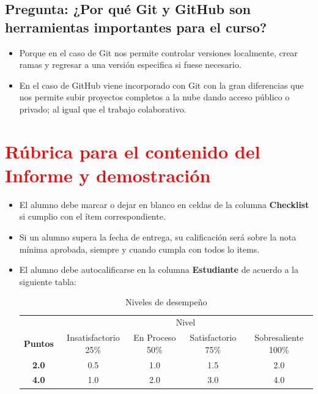 \documentclass{article}
\begin{document}
\subsection{Pregunta: ¿Por qué Git y GitHub son herramientas importantes para el curso?}
\begin{itemize}
	\item Porque en el caso de Git nos permite controlar versiones localmente, 
	crear ramas y regresar a una versión especifica si fuese necesario.
	\item En el caso de GitHub viene incorporado con Git con la gran diferencias que nos permite
	subir proyectos completos a la nube dando acceso público o privado; al igual que el trabajo colaborativo.
\end{itemize}   
	\clearpage
	\section{\textcolor{red}{Rúbrica para el contenido del Informe y demostración}}
	\begin{itemize}			
		\item El alumno debe marcar o dejar en blanco en celdas de la columna \textbf{Checklist} si cumplio con el ítem correspondiente.
		\item Si un alumno supera la fecha de entrega,  su calificación será sobre la nota mínima aprobada, siempre y cuando cumpla con todos lo items.
		\item El alumno debe autocalificarse en la columna \textbf{Estudiante} de acuerdo a la siguiente tabla:
	
		\begin{table}[ht]
			\caption{Niveles de desempeño}
			\begin{center}
			\begin{tabular}{ccccc}
    			\hline
    			 & \multicolumn{4}{c}{Nivel}\\
    			\cline{1-5}
    			\textbf{Puntos} & Insatisfactorio 25\%& En Proceso 50\% & Satisfactorio 75\% & Sobresaliente 100\%\\
    			\textbf{2.0}&0.5&1.0&1.5&2.0\\
    			\textbf{4.0}&1.0&2.0&3.0&4.0\\
    		\hline
			\end{tabular}
		\end{center}
	\end{table}	
	
	\end{itemize}
	
\end{document}
